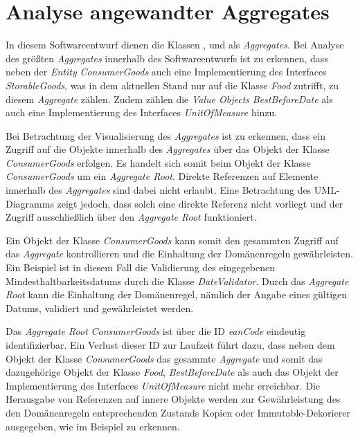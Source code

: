 \section{Analyse angewandter Aggregates}
\label{domaindrivendesign>aggregates}
In diesem Softwareentwurf dienen die Klassen \href{}{}, \href{}{} und \href{}{} als \textit{Aggregates}.
Bei Analyse des größten \textit{Aggregates} innerhalb des Softwareentwurfs ist zu erkennen, dass neben der \textit{Entity} \href{}{\code{}}\textit{ConsumerGoods} auch eine Implementierung des Interfaces \href{}{\code{}}\textit{StorableGoods}, was in dem aktuellen Stand nur auf die Klasse \href{}{\code{}}\textit{Food} zutrifft, zu diesem \textit{Aggregate} zählen. 
Zudem zählen die \textit{Value Objects} \textit{BestBeforeDate} als auch eine Implementierung des Interfaces \textit{UnitOfMeasure} hinzu.


Bei Betrachtung der Visualisierung des \textit{Aggregates} ist zu erkennen, dass ein Zugriff auf die Objekte innerhalb des \textit{Aggregates} über das Objekt der Klasse \href{}{\code{}}\textit{ConsumerGoods} erfolgen.
Es handelt sich somit beim Objekt der Klasse \href{}{\code{}}\textit{ConsumerGoods} um ein \textit{Aggregate Root}.
Direkte Referenzen auf Elemente innerhalb des \textit{Aggregates} sind dabei nicht erlaubt.
Eine Betrachtung des UML-Diagramms \href{}{\code{}} zeigt jedoch, dass solch eine direkte Referenz nicht vorliegt und der Zugriff ausschließlich über den \textit{Aggregate Root} funktioniert.

Ein Objekt der Klasse \href{}{\code{}}\textit{ConsumerGoods} kann somit den gesammten Zugriff auf das \textit{Aggregate} kontrollieren und die Einhaltung der Domänenregeln gewährleisten.
Ein Beispiel ist in diesem Fall die Validierung des eingegebenen Mindesthaltbarkeitsdatums durch die Klasse \href{}{\code{}}\textit{DateValidator}.
Durch das \textit{Aggregate Root} kann die Einhaltung der Domänenregel, nämlich der Angabe eines gültigen Datums, validiert und gewährleistet werden.

Das \textit{Aggregate Root} \textit{ConsumerGoods} ist über die ID \href{}{\code{}}\textit{eanCode} eindeutig identifizierbar.
Ein Verlust dieser ID zur Laufzeit führt dazu, dass neben dem Objekt der Klasse \href{}{\code{}}\textit{ConsumerGoods} das gesammte \textit{Aggregate} und somit das dazugehörige Objekt der Klasse \href{}{\code{}}\textit{Food}, \href{}{\code{}}\textit{BestBeforeDate} als auch das Objekt der Implementierung des Interfaces \textit{UnitOfMeasure} nicht mehr erreichbar.
Die Herausgabe von Referenzen auf innere Objekte werden zur Gewährleistung des den Domänenregeln entsprechenden Zustands Kopien oder Immutable-Dekorierer ausgegeben, wie im Beispiel \href{}{\code{}} zu erkennen.

